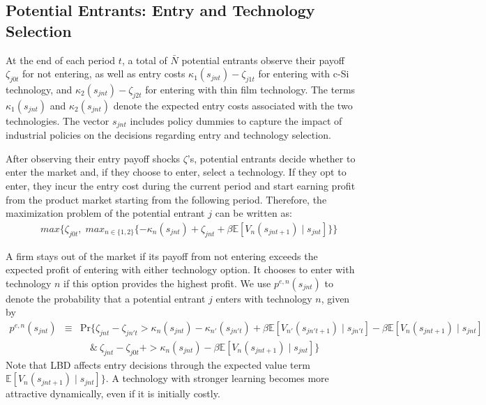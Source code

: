 \documentclass[12pt]{article}
\begin{document}
\subsection{Potential Entrants: Entry and Technology Selection}
At the end of each period $t$, a total of $\bar N$ potential entrants observe their payoff $\zeta_{j0t}$ for not entering, as well as entry costs $\kappa_1(s_{jnt})-\zeta_{j1t}$ for entering with c-Si technology, and $\kappa_2(s_{jnt})-\zeta_{j2t}$ for entering with thin film technology. The terms $\kappa_1(s_{jnt})$ and $\kappa_2(s_{jnt})$ denote the expected entry costs associated with the two technologies. The vector $s_{jnt}$ includes policy dummies to capture the impact of industrial policies on the decisions regarding entry and technology selection.

After observing their entry payoff shocks $\zeta$'s, potential entrants decide whether to enter the market and, if they choose to enter, select a technology. If they opt to enter, they incur the entry cost during the current period and start earning profit from the product market starting from the following period. Therefore, the maximization problem of the potential entrant $j$ can be written as:
\begin{eqnarray}
 && max\Big\{\zeta_{j0t}, \; max_{n\in \{1,2\}} \{-\kappa_n(s_{jnt}) + \zeta_{jnt} + \beta \mathbb{E}[V_n(s_{jnt+1}) \mid s_{jnt}]\} \Big\}
\end{eqnarray}

A firm stays out of the market if its payoff from not entering exceeds the expected profit of entering with either technology option. It chooses to enter with technology $n$ if this option provides the highest profit. We use $p^{e,n}(s_{jnt})$ to denote the probability that a potential entrant $j$ enters with technology $n$, given by
\begin{eqnarray}
  p^{e,n}(s_{jnt}) & \equiv & \text{Pr}\Big\{\zeta_{jnt} - \zeta_{jn't}  > \kappa_n(s_{jnt})-\kappa_{n'}(s_{jn't}) + \beta \mathbb{E}[V_{n'}(s_{jn't+1}) \mid s_{jn't}] - \beta \mathbb{E}[V_n(s_{jnt+1}) \mid s_{jnt}] \nonumber \\
  & & \quad  \& \  \zeta_{jnt}-\zeta_{j0t} + >\kappa_n(s_{jnt})-\beta \mathbb{E}[V_n(s_{jnt+1}) \mid s_{jnt}] \Big\} \label{eq:entry_policy_fn}
\end{eqnarray}
Note that LBD affects entry decisions through the expected value term $\mathbb{E}[V_n(s_{jnt+1}) \mid s_{jnt}]\}$. A technology with stronger learning becomes more attractive dynamically, even if it is initially costly.
\end{document}
